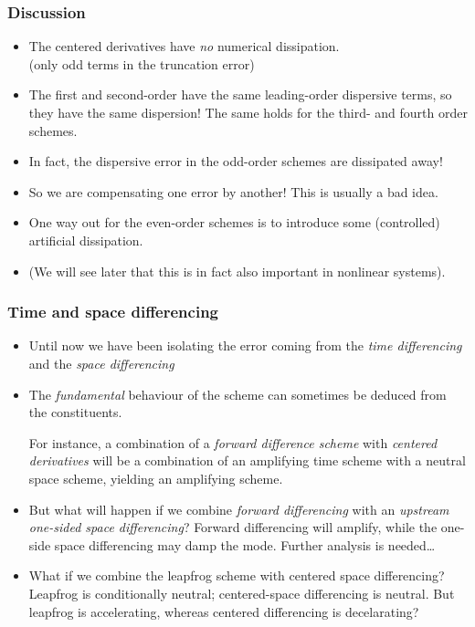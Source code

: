 \documentclass[aspectratio=149,9pt]{beamer}
\begin{document}
%
%
\begin{frame}
	\frametitle{Discussion}
	\vfill\begin{itemize}
		\item The centered derivatives have \emph{no} numerical dissipation.\\
			(only odd terms in the truncation error)\vfill
		\item The first and second-order have the same leading-order dispersive terms, so they have the same dispersion! The same holds for the third- and fourth order schemes.\vspace*{2ex}
		\item In fact, the dispersive error in the odd-order schemes are dissipated away!\vfill
		\item So we are compensating one error by another! This is usually a bad idea.\vfill
		\item One way out for the even-order schemes is to introduce some (controlled) artificial dissipation.\vfill
		\item (We will see later that this is in fact also important in nonlinear systems).
	\end{itemize}\vfill
\end{frame}
%
%
\begin{frame}
	\frametitle{Time and space differencing}
	\vfill\begin{itemize}
		\item Until now we have been isolating the error coming from the \emph{time differencing} and the \emph{space differencing}\vfill
		\item The \emph{fundamental} behaviour of the scheme can sometimes be deduced from the constituents.\vfill
			\par
			For instance, a combination of a \emph{forward difference scheme} with \emph{centered derivatives} will be a combination of an amplifying time scheme with a neutral space scheme, yielding an amplifying scheme.\vfill
		\item But what will happen if we combine \emph{forward differencing} with an \emph{upstream one-sided space differencing}? Forward differencing will amplify, while the one-side space differencing may damp the mode. Further analysis is needed\ldots\vfill
		\item What if we combine the leapfrog scheme with centered space differencing? Leapfrog is conditionally neutral; centered-space differencing is neutral. But leapfrog is accelerating, whereas centered differencing is decelarating?
	\end{itemize}\vfill
\end{frame}
\end{document}
